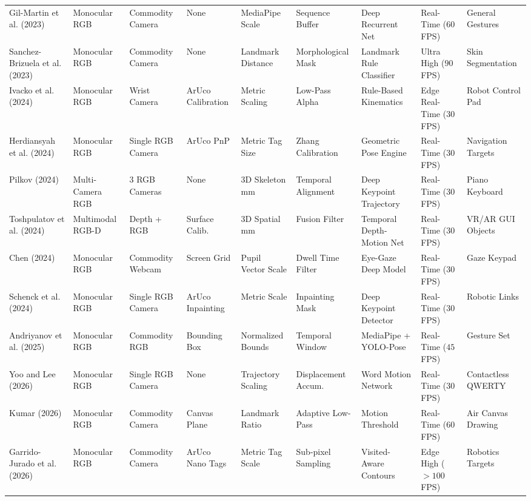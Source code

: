\begin{table}[htbp]
{\begin{tabular}{l l l l l l l l l}
Gil-Martin et al. (2023) \cite{GilMartin2023Hand} & Monocular RGB & Commodity Camera & None & MediaPipe Scale & Sequence Buffer & Deep Recurrent Net & Real-Time ($60$ FPS) & General Gestures \\
Sanchez-Brizuela et al. (2023) \cite{SanchezBrizuela2023Lightweight} & Monocular RGB & Commodity Camera & None & Landmark Distance & Morphological Mask & Landmark Rule Classifier & Ultra High ($90$ FPS) & Skin Segmentation \\
Ivacko et al. (2024) \cite{Ivacko2024Edge} & Monocular RGB & Wrist Camera & ArUco Calibration & Metric Scaling & Low-Pass Alpha & Rule-Based Kinematics & Edge Real-Time ($30$ FPS) & Robot Control Pad \\
Herdiansyah et al. (2024) \cite{Herdiansyah2024Implementation} & Monocular RGB & Single RGB Camera & ArUco PnP & Metric Tag Size & Zhang Calibration & Geometric Pose Engine & Real-Time ($30$ FPS) & Navigation Targets \\
Pilkov (2024) \cite{Pilkov2024Markerless} & Multi-Camera RGB & 3 RGB Cameras & None & 3D Skeleton mm & Temporal Alignment & Deep Keypoint Trajectory & Real-Time ($30$ FPS) & Piano Keyboard \\
Toshpulatov et al. (2024) \cite{Toshpulatov2024RealTime} & Multimodal RGB-D & Depth + RGB & Surface Calib. & 3D Spatial mm & Fusion Filter & Temporal Depth-Motion Net & Real-Time ($30$ FPS) & VR/AR GUI Objects \\
Chen (2024) \cite{Chen2024Gaze} & Monocular RGB & Commodity Webcam & Screen Grid & Pupil Vector Scale & Dwell Time Filter & Eye-Gaze Deep Model & Real-Time ($30$ FPS) & Gaze Keypad \\
Schenck et al. (2024) \cite{Schenck2024Utilizing} & Monocular RGB & Single RGB Camera & ArUco Inpainting & Metric Scale & Inpainting Mask & Deep Keypoint Detector & Real-Time ($30$ FPS) & Robotic Links \\
Andriyanov et al. (2025) \cite{Andriyanov2025Improving} & Monocular RGB & Commodity RGB & Bounding Box & Normalized Bounds & Temporal Window & MediaPipe + YOLO-Pose & Real-Time ($45$ FPS) & Gesture Set \\
Yoo and Lee (2026) \cite{Yoo2026WordLevel} & Monocular RGB & Single RGB Camera & None & Trajectory Scaling & Displacement Accum. & Word Motion Network & Real-Time ($30$ FPS) & Contactless QWERTY \\
Kumar (2026) \cite{Kumar2026Hybrid} & Monocular RGB & Commodity Camera & Canvas Plane & Landmark Ratio & Adaptive Low-Pass & Motion Threshold & Real-Time ($60$ FPS) & Air Canvas Drawing \\
Garrido-Jurado et al. (2026) \cite{GarridoJurado2026ArUco} & Monocular RGB & Commodity Camera & ArUco Nano Tags & Metric Tag Scale & Sub-pixel Sampling & Visited-Aware Contours & Edge High ($> 100$ FPS) & Robotics Targets \\
\bottomrule
\end{tabular}%
}
\end{table}

